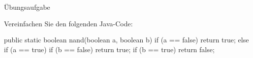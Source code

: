 \begin{frame}[fragile]{Übungsaufgabe}\onslide<+->%
    \begin{exercise*}{Vereinfachen Sie den folgenden Java-Code:}
        \begin{plainjava}
public static boolean nand(boolean a, boolean b) {
    if (a == false) return true;
    else if (a == true) {
        if (b == false) return true;
        if (b == true) return false;
    }
}
        \end{plainjava}
    \end{exercise*}
\end{frame}
